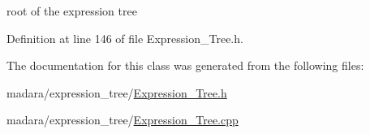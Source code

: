 root of the expression tree 



Definition at line 146 of file Expression\_\-Tree.h.



The documentation for this class was generated from the following files:\begin{DoxyCompactItemize}
\item 
madara/expression\_\-tree/\hyperlink{Expression__Tree_8h}{Expression\_\-Tree.h}\item 
madara/expression\_\-tree/\hyperlink{Expression__Tree_8cpp}{Expression\_\-Tree.cpp}\end{DoxyCompactItemize}
